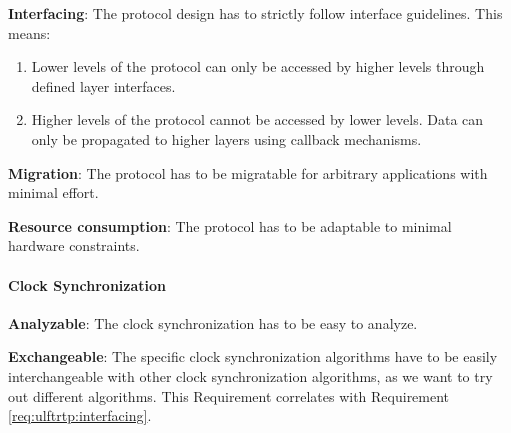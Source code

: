 \begin{req}
\label{req:ulftrtp:interfacing}
\textbf{Interfacing}: The protocol design has to strictly follow interface guidelines. This means:
\begin{enumerate}
 \item Lower levels of the protocol can only be accessed by higher levels through defined layer interfaces.
 \item Higher levels of the protocol cannot be accessed by lower levels. Data can only be propagated to higher layers using callback mechanisms. 
\end{enumerate}
\end{req}

\begin{req}
\label{req:ulftrtp:easy migration}
\textbf{Migration}: The protocol has to be migratable for arbitrary applications with minimal effort.
\end{req}

\begin{req}
\label{req:ulftrtp:resource consumption}
\textbf{Resource consumption}: The protocol has to be adaptable to minimal hardware constraints.
\end{req}


\paragraph{Clock Synchronization}
\begin{req}
\label{req:clock:analyzeable}
\textbf{Analyzable}: The clock synchronization has to be easy to analyze.
\end{req}

\begin{req}
\label{req:clock:exchangeable}
\textbf{Exchangeable}: The specific clock synchronization algorithms have to be easily interchangeable with other 
clock synchronization algorithms, as we want to try out different algorithms. This Requirement correlates with 
Requirement \ref{req:ulftrtp:interfacing}.
\end{req}
